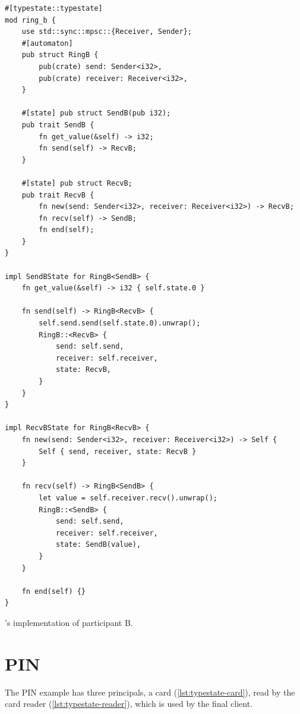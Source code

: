 \begin{listing}
    \begin{verbatim}
#[typestate::typestate]
mod ring_b {
    use std::sync::mpsc::{Receiver, Sender};
    #[automaton]
    pub struct RingB {
        pub(crate) send: Sender<i32>,
        pub(crate) receiver: Receiver<i32>,
    }

    #[state] pub struct SendB(pub i32);
    pub trait SendB {
        fn get_value(&self) -> i32;
        fn send(self) -> RecvB;
    }

    #[state] pub struct RecvB;
    pub trait RecvB {
        fn new(send: Sender<i32>, receiver: Receiver<i32>) -> RecvB;
        fn recv(self) -> SendB;
        fn end(self);
    }
}

impl SendBState for RingB<SendB> {
    fn get_value(&self) -> i32 { self.state.0 }

    fn send(self) -> RingB<RecvB> {
        self.send.send(self.state.0).unwrap();
        RingB::<RecvB> {
            send: self.send,
            receiver: self.receiver,
            state: RecvB,
        }
    }
}

impl RecvBState for RingB<RecvB> {
    fn new(send: Sender<i32>, receiver: Receiver<i32>) -> Self {
        Self { send, receiver, state: RecvB }
    }

    fn recv(self) -> RingB<SendB> {
        let value = self.receiver.recv().unwrap();
        RingB::<SendB> {
            send: self.send,
            receiver: self.receiver,
            state: SendB(value),
        }
    }

    fn end(self) {}
}
    \end{verbatim}
    \caption{'s implementation of participant B.}
    \label{lst:typestate-ring-follower}
\end{listing}


\section{PIN}

The PIN example has three principals, a card (\autoref{lst:typestate-card}),
read by the card reader (\autoref{lst:typestate-reader}),
which is used by the final client.

